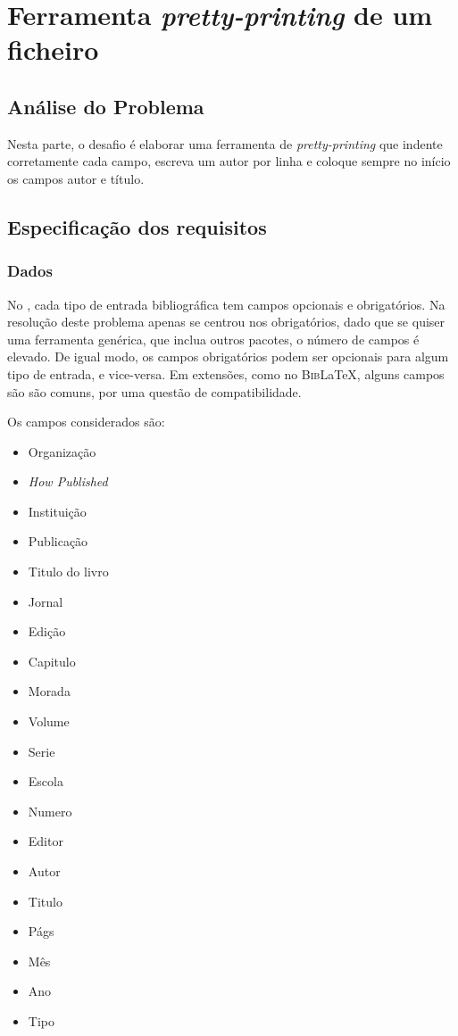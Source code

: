 \chapter{Ferramenta \emph{pretty-printing} de um ficheiro }
\label{chap:b2}

\section{Análise do Problema}
\label{sec:b2p:b2}
Nesta parte, o desafio é elaborar uma ferramenta de \emph{pretty-printing} que
indente corretamente cada campo, escreva um autor por linha e coloque sempre no
início os campos autor e título.

\section{Especificação dos requisitos}
\label{sec:spec:b2}

\subsection{Dados}

No , cada tipo de entrada bibliográfica tem campos opcionais
e obrigatórios. Na resolução deste problema apenas se centrou nos obrigatórios,
dado que se quiser uma ferramenta genérica, que inclua outros pacotes, o número
de campos é elevado. De igual modo, os campos obrigatórios podem ser opcionais
para algum tipo de entrada, e vice-versa. Em extensões, como no
\textsc{Bib}\LaTeX{}, alguns campos são são comuns, por uma questão de compatibilidade.

Os campos considerados são:

\begin{itemize}


\item Organização
\item \emph{How Published}
\item Instituição
\item Publicação
\item Titulo do livro
\item Jornal
\item Edição
\item Capitulo
\item Morada
\item Volume
\item Serie
\item Escola
\item Numero
\item Editor
\item Autor
\item Titulo
\item Págs
\item Mês
\item Ano
\item Tipo

\end{itemize}

